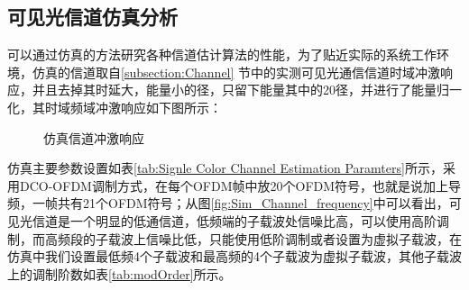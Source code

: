 \subsection{可见光信道仿真分析}
可以通过仿真的方法研究各种信道估计算法的性能，为了贴近实际的系统工作环境，仿真的信道取自\ref{subsection:Channel} 节中的实测可见光通信信道时域冲激响应，并且去掉其时延大，能量小的径，只留下能量其中的20径，并进行了能量归一化，其时域频域冲激响应如下图所示：
\begin{figure}[htbp]
    \centering
    \caption{仿真信道冲激响应}
    \label{fig:ZC_frequency_time}
\end{figure}
仿真主要参数设置如表\ref{tab:Signle Color Channel Estimation Paramters}所示，采用DCO-OFDM调制方式，在每个OFDM帧中放20个OFDM符号，也就是说加上导频，一帧共有21个OFDM符号；从图\ref{fig:Sim_Channel_frequency}中可以看出，可见光信道是一个明显的低通信道，低频端的子载波处信噪比高，可以使用高阶调制，而高频段的子载波上信噪比低，只能使用低阶调制或者设置为虚拟子载波，在仿真中我们设置最低频4个子载波和最高频的4个子载波为虚拟子载波，其他子载波上的调制阶数如表\ref{tab:modOrder}所示。
